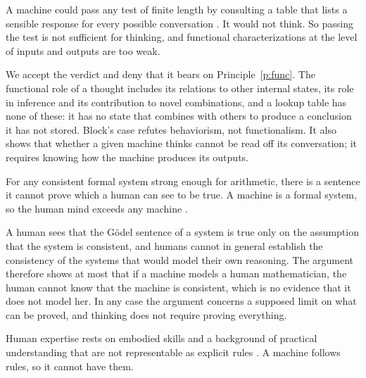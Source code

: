 \documentclass{situationist-preprint}
\begin{document}
\begin{objection}[Blockhead]
A machine could pass any test of finite length by consulting a table that lists a sensible response for every possible conversation \citep{Block1981}. It would not think. So passing the test is not sufficient for thinking, and functional characterizations at the level of inputs and outputs are too weak.
\end{objection}

\begin{reply}
We accept the verdict and deny that it bears on Principle~\ref{p:func}. The functional role of a thought includes its relations to other internal states, its role in inference and its contribution to novel combinations, and a lookup table has none of these: it has no state that combines with others to produce a conclusion it has not stored. Block's case refutes behaviorism, not functionalism. It also shows that whether a given machine thinks cannot be read off its conversation; it requires knowing how the machine produces its outputs.
\end{reply}

\begin{objection}[G\"odel]
For any consistent formal system strong enough for arithmetic, there is a sentence it cannot prove which a human can see to be true. A machine is a formal system, so the human mind exceeds any machine \citep{Lucas1961,Penrose1989}.
\end{objection}

\begin{reply}
A human sees that the G\"odel sentence of a system is true only on the assumption that the system is consistent, and humans cannot in general establish the consistency of the systems that would model their own reasoning. The argument therefore shows at most that if a machine models a human mathematician, the human cannot know that the machine is consistent, which is no evidence that it does not model her. In any case the argument concerns a supposed limit on what can be proved, and thinking does not require proving everything.
\end{reply}

\begin{objection}
Human expertise rests on embodied skills and a background of practical understanding that are not representable as explicit rules \citep{Dreyfus1972}. A machine follows rules, so it cannot have them.
\end{objection}
\end{document}
